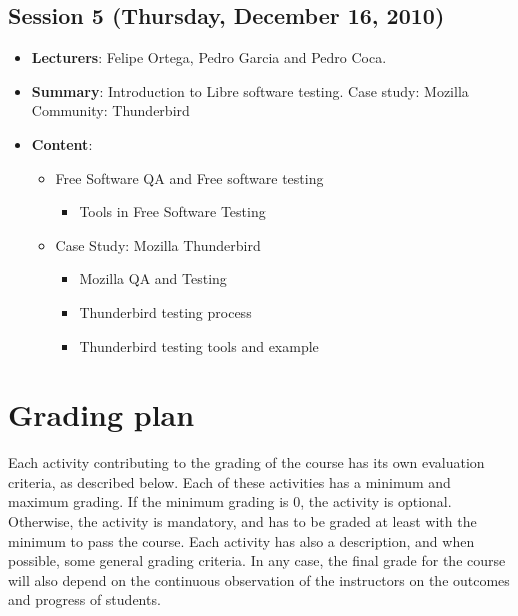 \documentclass[a4paper]{article}
\begin{document}
\subsection{Session 5 (Thursday, December 16, 2010)}

\begin{itemize}
 \item \textbf{Lecturers}: Felipe Ortega, Pedro Garcia and Pedro Coca.
 \item \textbf{Summary}: Introduction to Libre software testing. Case study: Mozilla Community: Thunderbird
 \item \textbf{Content}:

    \begin{itemize}

     \item Free Software QA and Free software testing

      \begin{itemize}
       \item Tools in Free Software Testing
      \end{itemize}

     \item Case Study: Mozilla Thunderbird

        \begin{itemize}
         \item Mozilla QA and Testing
         \item Thunderbird testing process
         \item Thunderbird testing tools and example
        \end{itemize}

    \end{itemize}
   

\end{itemize}

\section{Grading plan}

Each activity contributing to the grading of the course has its own evaluation criteria, as described below. Each of these activities has a minimum and maximum grading. If the minimum grading is 0, the activity is optional. Otherwise, the activity is mandatory, and has to be graded at least with the minimum to pass the course. Each activity has also a description, and when possible, some general grading criteria. In any case, the final grade for the course will also depend on the continuous observation of the instructors on the outcomes and progress of students.
\end{document}
